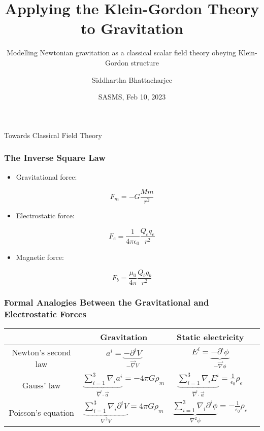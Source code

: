\documentclass{beamer}
\title{Applying the Klein-Gordon Theory to Gravitation}
\subtitle{Modelling Newtonian gravitation as a classical scalar field theory obeying Klein-Gordon structure}
\author{Siddhartha Bhattacharjee}
\institute
{
1B Mathematical Physics \\
University of Waterloo
}
\date{SASMS, Feb 10, 2023}
\begin{document}
\frame{\titlepage}

\begin{frame}
\begin{center}
\huge \textcolor{blue!50!gray}{Towards Classical Field Theory}
\end{center}
\end{frame}

\begin{frame}
\frametitle{The Inverse Square Law}

\begin{itemize}
\item Gravitational force:
\end{itemize}

$$F_m = - G \frac{M m}{r^2}$$

\begin{itemize}
\item Electrostatic force:
\end{itemize}

$$F_e = \frac{1}{4 \pi \epsilon_0} \frac{Q_e q_e}{r^2}$$

\begin{itemize}
\item Magnetic force:
\end{itemize}

$$F_b = \frac{\mu_0}{4 \pi} \frac{Q_b q_b}{r^2}$$
\end{frame}

\begin{frame}
\frametitle{Formal Analogies Between the Gravitational and Electrostatic Forces}

\begin{center}
\begin{tabular}{ |c|c|c|c| } 
\hline
& Gravitation & Static electricity \\
\hline
Newton's second law & $a^i = \underset{- \vec{\nabla} V}{\underbrace{- \partial^i V}}$ & $E^i = \underset{- \vec{\nabla} \phi}{\underbrace{- \partial^i \phi}}$ \\
\hline
Gauss' law & $\underset{\vec{\nabla} \cdot \vec{a}}{\underbrace{\sum \limits_{i=1}^3 \nabla_i a^i}} = - 4 \pi G \rho_m$ & $\underset{\vec{\nabla} \cdot \vec{a}}{\underbrace{\sum \limits_{i=1}^3 \nabla_i E^i}} = \frac{1}{\epsilon_0} \rho_e$ \\
\hline
Poisson's equation & $\underset{\nabla^2 V}{\underbrace{\sum \limits_{i=1}^3 \nabla_i \partial^i V}} = 4 \pi G \rho_m$ & $\underset{\nabla^2 \phi}{\underbrace{\sum \limits_{i=1}^3 \nabla_i \partial^i \phi}} = - \frac{1}{\epsilon_0} \rho_e$ \\  
\hline
\end{tabular}
\end{center}
\end{frame}
\end{document}
